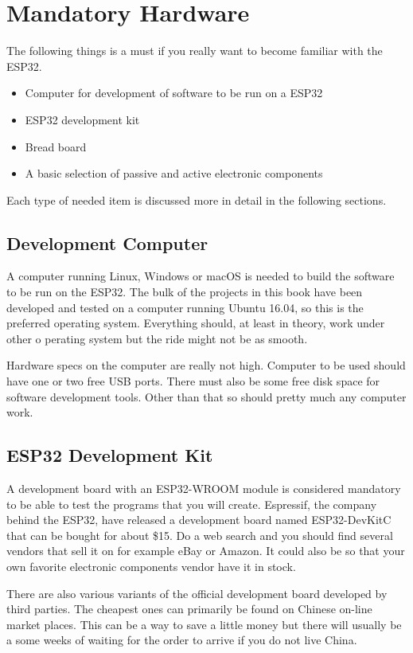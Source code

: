 \documentclass{tufte-book}
\begin{document}
\section{Mandatory Hardware}\label{sec:hardware}
The following things is a must if you really want to become familiar with the ESP32.

\begin{itemize}
	\item Computer for development of software to be run on a ESP32
	\item ESP32 development kit
	\item Bread board
	\item A basic selection of passive and active electronic components
\end{itemize}

Each type of needed item is discussed more in detail in the following sections.

\subsection{Development Computer}
A computer running Linux, Windows or macOS is needed to build the software to 
be run on the ESP32. The bulk of the projects in this book have been developed 
and tested on a computer running Ubuntu 16.04, so this is the preferred 
operating system. Everything should, at least in theory, work under other o
perating system but the ride might not be as smooth.

Hardware specs on the computer are really not high. Computer to be used should 
have one or two free USB ports. There must also be some free disk space for 
software development tools. Other than that so should pretty much any computer 
work.

\subsection{ESP32 Development Kit}
A development board with an ESP32-WROOM module is considered mandatory to be 
able to test the programs that you will create. Espressif, the company behind 
the ESP32, have released a development board named ESP32-DevKitC that can be 
bought for about \$15. Do a web search and you should find several vendors that 
sell it on for example eBay or Amazon. It could also be so that your own 
favorite electronic components vendor have it in stock.

There are also various variants of the official development board developed by 
third parties. The cheapest ones can primarily be found on Chinese on-line 
market places. This can be a way to save a little money but there will usually 
be a some weeks of waiting for the order to arrive if you do not live China.
\end{document}
